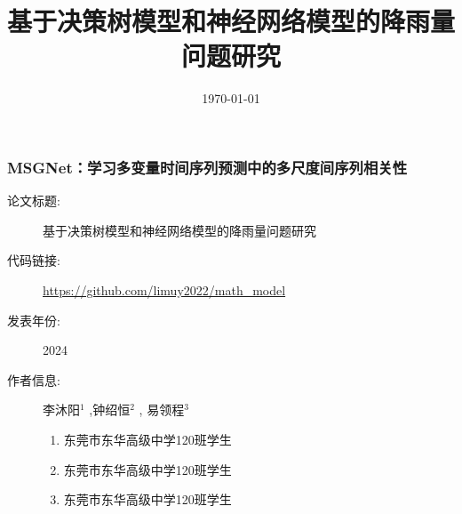 \documentclass[10pt]{beamer}
\title[]{ {\Large 基于决策树模型和神经网络模型的降雨量问题研究 }}
\author[Arthur, Doe]{\textbf{李沐阳 \and 钟绍恒 \and 易领程}}
\institute[VFU] {}
\date{\today} %
\begin{document}
	{
		\frame{\titlepage}
	}

	

	

\begin{frame}
	\frametitle{MSGNet：学习多变量时间序列预测中的多尺度间序列相关性}


\begin{description}
	\item[论文标题:]  基于决策树模型和神经网络模型的降雨量问题研究
	\item[代码链接:]   \url{https://github.com/limuy2022/math_model}
	\item[发表年份:]   2024
	\item[作者信息:]   李沐阳$^1$ ,钟绍恒$^2$ , 易领程$^3$
	
	\begin{enumerate}
		\item  东莞市东华高级中学120班学生
		\item 	 东莞市东华高级中学120班学生
		\item 	 东莞市东华高级中学120班学生
	\end{enumerate}
\end{description}

\end{frame}
\end{document}
